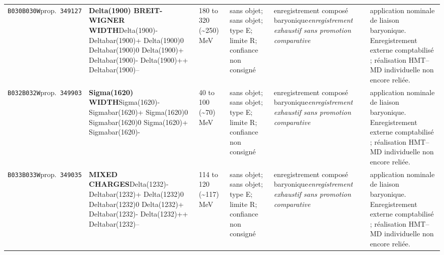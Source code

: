 \begin{landscape}
\begin{longtable}{L{1.85cm}L{4.45cm}L{2.35cm}L{4.05cm}L{3.35cm}L{7.15cm}}
\texttt{B030}\newline \texttt{B030W}\newline prop.\ \texttt{349127} & \textbf{Delta(1900) BREIT-WIGNER WIDTH}\newline Delta(1900)- \textbar{}\allowbreak{} Deltabar(1900)+ \textbar{}\allowbreak{} Delta(1900)0 \textbar{}\allowbreak{} Deltabar(1900)0 \textbar{}\allowbreak{} Delta(1900)+ \textbar{}\allowbreak{} Deltabar(1900)- \textbar{}\allowbreak{} Delta(1900)++ \textbar{}\allowbreak{} Deltabar(1900)-- & 180 to 320 (\textasciitilde{}250)\,MeV & sans objet; sans objet; type E; limite R; confiance non consigné & enregistrement composé baryonique\newline \emph{enregistrement exhaustif sans promotion comparative} & application nominale de liaison baryonique. Enregistrement externe comptabilisé ; réalisation HMT--MD individuelle non encore reliée. \\
\texttt{B032}\newline \texttt{B032W}\newline prop.\ \texttt{349903} & \textbf{Sigma(1620) WIDTH}\newline Sigma(1620)- \textbar{}\allowbreak{} Sigmabar(1620)+ \textbar{}\allowbreak{} Sigma(1620)0 \textbar{}\allowbreak{} Sigmabar(1620)0 \textbar{}\allowbreak{} Sigma(1620)+ \textbar{}\allowbreak{} Sigmabar(1620)- & 40 to 100 (\textasciitilde{}70)\,MeV & sans objet; sans objet; type E; limite R; confiance non consigné & enregistrement composé baryonique\newline \emph{enregistrement exhaustif sans promotion comparative} & application nominale de liaison baryonique. Enregistrement externe comptabilisé ; réalisation HMT--MD individuelle non encore reliée. \\
\texttt{B033}\newline \texttt{B033W}\newline prop.\ \texttt{349035} & \textbf{MIXED CHARGES}\newline Delta(1232)- \textbar{}\allowbreak{} Deltabar(1232)+ \textbar{}\allowbreak{} Delta(1232)0 \textbar{}\allowbreak{} Deltabar(1232)0 \textbar{}\allowbreak{} Delta(1232)+ \textbar{}\allowbreak{} Deltabar(1232)- \textbar{}\allowbreak{} Delta(1232)++ \textbar{}\allowbreak{} Deltabar(1232)-- & 114 to 120 (\textasciitilde{}117)\,MeV & sans objet; sans objet; type E; limite R; confiance non consigné & enregistrement composé baryonique\newline \emph{enregistrement exhaustif sans promotion comparative} & application nominale de liaison baryonique. Enregistrement externe comptabilisé ; réalisation HMT--MD individuelle non encore reliée. \\

\end{longtable}
\end{landscape}
